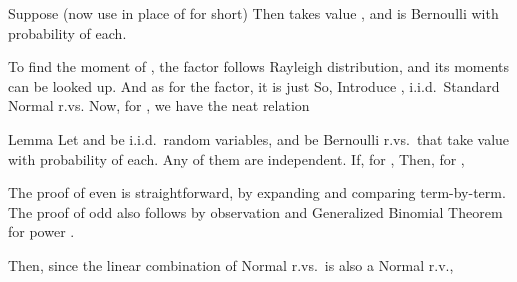 Suppose (now use  in place of  for short)
Then  takes value , and is Bernoulli with probability  of each.

To find the moment of , the  factor follows Rayleigh distribution, and its moments can be looked up.
And as for the  factor, it is just
So,
Introduce , i.i.d.\ Standard Normal r.vs.
Now, for , we have the neat relation

\Result
{Lemma}
{
Let  and  be i.i.d.\ random variables,
and  be Bernoulli r.vs.\ that take value  with probability  of each.
Any of them are independent.
If, for ,
Then, for ,
}

The proof of even  is straightforward, by expanding and comparing term-by-term.
The proof of odd  also follows by observation  and Generalized Binomial Theorem for power .


Then, since the linear combination of Normal r.vs.\ is also a Normal r.v.,

\stopsubsection

\startsubsection [title={Using Chernoff Inequality}]

